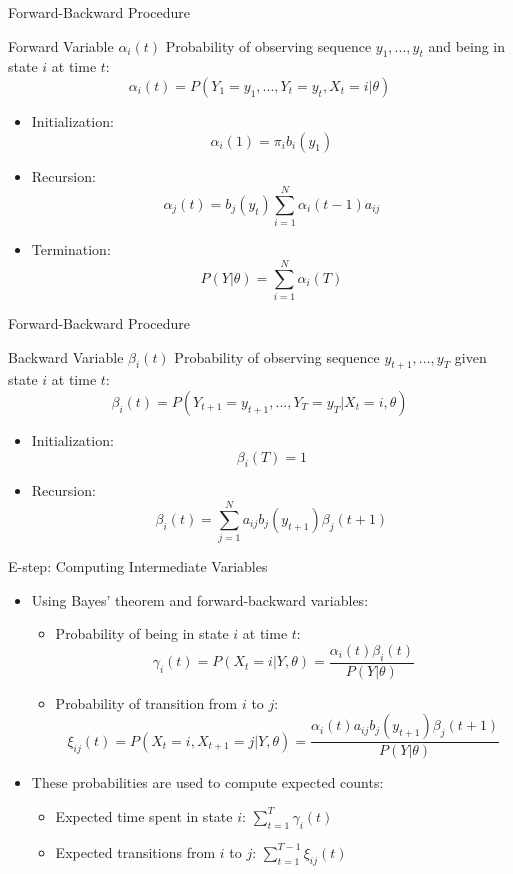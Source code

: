 \documentclass{beamer}
\begin{document}
\begin{frame}{Forward-Backward Procedure}
    \begin{block}{Forward Variable $\alpha_i(t)$}
        Probability of observing sequence $y_1, ..., y_t$ and being in state $i$ at time $t$:
        \[\alpha_i(t) = P(Y_1=y_1, ..., Y_t=y_t, X_t=i | \theta)\]
        \begin{itemize}
            \item Initialization:
            \[\alpha_i(1) = \pi_i b_i(y_1)\]
            \item Recursion:
            \[\alpha_j(t) = b_j(y_t) \sum_{i=1}^N \alpha_i(t-1)a_{ij}\]
            \item Termination:
            \[P(Y|\theta) = \sum_{i=1}^N \alpha_i(T)\]
        \end{itemize}
    \end{block}
\end{frame}

\begin{frame}{Forward-Backward Procedure}
    \begin{block}{Backward Variable $\beta_i(t)$}
        Probability of observing sequence $y_{t+1}, ..., y_T$ given state $i$ at time $t$:
        \[\beta_i(t) = P(Y_{t+1}=y_{t+1}, ..., Y_T=y_T | X_t=i, \theta)\]
        \begin{itemize}
            \item Initialization:
            \[\beta_i(T) = 1\]
            \item Recursion:
            \[\beta_i(t) = \sum_{j=1}^N a_{ij}b_j(y_{t+1})\beta_j(t+1)\]
        \end{itemize}
    \end{block}
\end{frame}

\begin{frame}{E-step: Computing Intermediate Variables}
    \begin{itemize}
        \item Using Bayes' theorem and forward-backward variables:
        \begin{itemize}
            \item Probability of being in state $i$ at time $t$:
            \[\gamma_i(t) = P(X_t=i|Y,\theta) = \frac{\alpha_i(t)\beta_i(t)}{P(Y|\theta)}\]
            \item Probability of transition from $i$ to $j$:
            \[\xi_{ij}(t) = P(X_t=i,X_{t+1}=j|Y,\theta) = \frac{\alpha_i(t)a_{ij}b_j(y_{t+1})\beta_j(t+1)}{P(Y|\theta)}\]
        \end{itemize}
        \item These probabilities are used to compute expected counts:
        \begin{itemize}
            \item Expected time spent in state $i$: $\sum_{t=1}^T \gamma_i(t)$
            \item Expected transitions from $i$ to $j$: $\sum_{t=1}^{T-1} \xi_{ij}(t)$
        \end{itemize}
    \end{itemize}
\end{frame}
\end{document}
